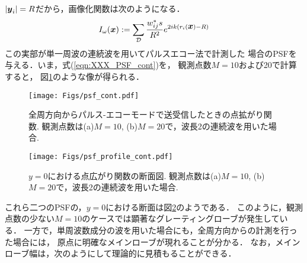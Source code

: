 $|\mbox{\boldmath $y$}_i|=R$だから，画像化関数は次のようになる．
\begin{equation}
	I_\omega(\mbox{\boldmath $x$})
		:=
	\sum_{\cal D} 
	\frac{w_{ij}^*s}{R^2}
	e^{
	2ik
	\left(
		r_i(\mbox{\boldmath $x$})-R
	\right)
	}
	\label{eqn:XXX_PSF_cont}
\end{equation}
この実部が単一周波の連続波を用いてパルスエコー法で計測した
場合のPSFを与える．いま，式(\ref{eqn:XXX_PSF_cont})を，
観測点数$M=10$および20で計算すると，
図\ref{fig:XXX_psf_cont}のような像が得られる．
\begin{figure}[h]
	\begin{center}
	\texttt{[image: Figs/psf\_cont.pdf]} 
	\end{center}
	\caption{
	全周方向からパルス-エコーモードで送受信したときの点拡がり関数.
	観測点数は(a)$M=10$, (b)$M=20$で，波長2の連続波を用いた場合.} 
	\label{fig:XXX_psf_cont}
\end{figure}
\begin{figure}[h]
	\begin{center}
	\texttt{[image: Figs/psf\_profile\_cont.pdf]} 
	\end{center}
	\caption{$y=0$における点広がり関数の断面図. 
	観測点数は(a)$M=10$, (b)$M=20$で，波長2の連続波を用いた場合.}
	\label{fig:XXX_psf_profile_cont}
\end{figure}
これら二つのPSFの，$y=0$における断面は図\ref{fig:XXX_psf_profile_cont}のようである．
このように，観測点数の少ない$M=10$のケースでは顕著なグレーティングローブが発生している．
一方で，単周波数成分の波を用いた場合にも，全周方向からの計測を行った場合には，
原点に明確なメインローブが現れることが分かる．
なお，メインローブ幅は，次のようにして理論的に見積もることができる．

